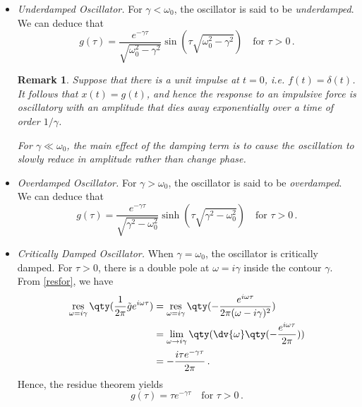 \documentclass{article}
\theoremstyle{plain}\theoremheaderfont{\normalfont\itshape}\theorembodyfont{\rmfamily}\theoremseparator{.}\newtheorem*{rem}{Remark}\newtheorem*{ex}{Example}\newtheorem*{proof}{Proof}\newtheorem*{altp}{Alternative proof}
\theoremstyle{plain}\theoremheaderfont{\normalfont\bfseries}\theorembodyfont{\rmfamily}\theoremseparator{.}\newtheorem{thm}{Theorem}[section]\newtheorem{lem}[thm]{Lemma}\newtheorem{prop}[thm]{Proposition}\newtheorem*{cor}{Corollary}\newtheorem{defn}[thm]{Definition}\newtheorem{clm}[thm]{Claim}\newtheorem{clminproof}{Claim}
\theoremstyle{break}\theoremheaderfont{\normalfont\itshape}\theorembodyfont{\rmfamily}\theoremseparator{.\medskip}\newtheorem*{proofskip}{Proof}\newtheorem*{exs}{Examples}\newtheorem*{rems}{Remarks}
\theoremstyle{break}\theoremheaderfont{\normalfont\bfseries}\theorembodyfont{\rmfamily}\theoremseparator{.\medskip}\newtheorem{lemskip}[thm]{Lemma}\newtheorem{defnskip}[thm]{Definition}\newtheorem{propskip}[thm]{Proposition}\newtheorem{thmskip}[thm]{Theorem}
\numberwithin{equation}{section}
\DeclareMathOperator*{\res}{res}
\begin{document}
	\begin{itemize}
		\item \textit{Underdamped Oscillator.} For \(\gamma<\omega_0\), the oscillator is said to be \textit{underdamped}. We can deduce that
		\[g(\tau)=\frac{e^{-\gamma\tau}}{\sqrt{\omega_0^2-\gamma^2}}\sin(\tau\sqrt{\omega_0^2-\gamma^2})\quad\text{for }\tau>0\,.\]
		\begin{rem}
			Suppose that there is a unit impulse at \(t=0\), i.e. \(f(t)=\delta(t)\). It follows that \(x(t)=g(t)\), and hence the response to an impulsive force is oscillatory with an amplitude that dies away exponentially over a time of order \(1/\gamma\).

			For \(\gamma\ll \omega_0\), the main effect of the damping term is to cause the oscillation to slowly reduce in amplitude rather than change phase.
		\end{rem}

		\item \textit{Overdamped Oscillator.} For \(\gamma>\omega_0\), the oscillator is said to be \textit{overdamped}. We can deduce that
		\[g(\tau)=\frac{e^{-\gamma\tau}}{\sqrt{\gamma^2-\omega_0^2}}\sinh(\tau\sqrt{\gamma^2-\omega_0^2})\quad\text{for }\tau>0\,.\]

		\item \textit{Critically Damped Oscillator.} When \(\gamma=\omega_0\), the oscillator is critically damped. For \(\tau>0\), there is a double pole at \(\omega=i\gamma\) inside the contour \(\gamma\). From \cref{resfor}, we have
		\begin{align*}
			\res_{\omega=i\gamma}\qty(\frac{1}{2\pi}\tilde{g}e^{i\omega\tau})&=\res_{\omega=i\gamma}\qty(-\frac{e^{i\omega\tau}}{2\pi(\omega-i\gamma)^2})\\
			&=\lim_{\omega\to i\gamma}\qty(\dv{\omega}\qty(-\frac{e^{i\omega\tau}}{2\pi}))\\
			&=-\frac{i\tau e^{-\gamma\tau}}{2\pi}\,.
		\end{align*}
		Hence, the residue theorem yields
		\[g(\tau)=\tau e^{-\gamma\tau}\quad\text{for }\tau>0\,.\]
	\end{itemize}
\end{document}
